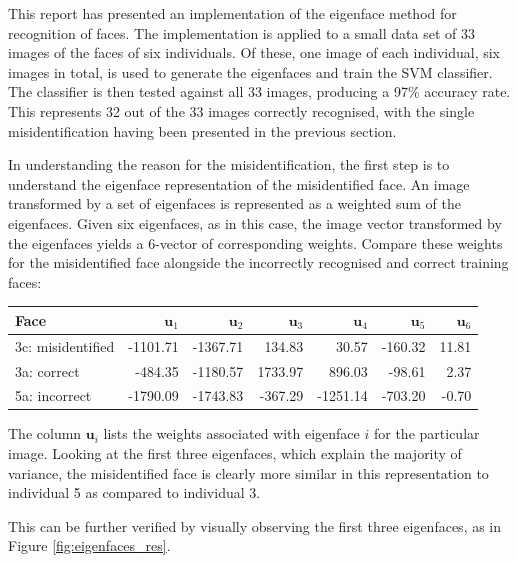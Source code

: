 This report has presented an implementation of the eigenface method for recognition of faces. The implementation is applied to a small data set of 33 images of the faces of six individuals. Of these, one image of each individual, six images in total, is used to generate the eigenfaces and train the SVM classifier. The classifier is then tested against all 33 images, producing a 97\% accuracy rate. This represents 32 out of the 33 images correctly recognised, with the single misidentification having been presented in the previous section.

In understanding the reason for the misidentification, the first step is to understand the eigenface representation of the misidentified face. An image transformed by a set of eigenfaces is represented as a weighted sum of the eigenfaces. Given six eigenfaces, as in this case, the image vector transformed by the eigenfaces yields a 6-vector of corresponding weights. Compare these weights for the misidentified face alongside the incorrectly recognised and correct training faces:

\begin{table}[ht]
  \small \centering {}
  \begin{tabularx}{0.78\textwidth}{l r r r r r r}
    \toprule
    \textbf{Face}     & $\bm{u}_1$ & $\bm{u}_2$ & $\bm{u}_3$ & $\bm{u}_4$ & $\bm{u}_5$ & $\bm{u}_6$ \\
    \midrule
    3c: misidentified &   -1101.71 &   -1367.71 &     134.83 &      30.57 &    -160.32 &      11.81 \\
    3a: correct       &    -484.35 &   -1180.57 &    1733.97 &     896.03 &     -98.61 &       2.37 \\
    5a: incorrect     &   -1790.09 &   -1743.83 &    -367.29 &   -1251.14 &    -703.20 &      -0.70 \\
    \bottomrule
  \end{tabularx}
\end{table}

The column $\bm{u}_i$ lists the weights associated with eigenface $i$ for the particular image. Looking at the first three eigenfaces, which explain the majority of variance, the misidentified face is clearly more similar in this representation to individual 5 as compared to individual 3.

This can be further verified by visually observing the first three eigenfaces, as in Figure \ref{fig:eigenfaces_res}.

